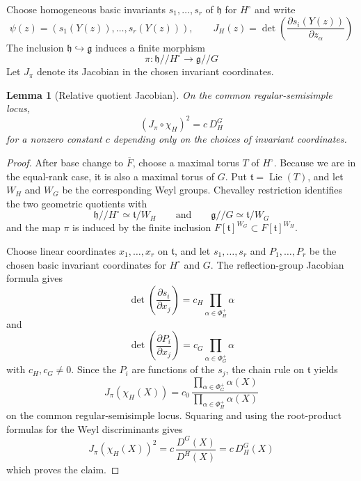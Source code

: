 \documentclass[11pt]{amsart}
\newtheorem{lemma}[lemma]{Lemma}
\theoremstyle{definition}
\theoremstyle{remark}
\newcommand{\Fb}{\overline F}
\newcommand{\Lie}{\operatorname{Lie}}
\newcommand{\g}{\mathfrak g}
\newcommand{\h}{\mathfrak h}
\newcommand{\tT}{\mathfrak t}
\begin{document}
Choose homogeneous basic invariants
$s_1,\ldots,s_r$ of $\h$ for $H^\circ$ and write
\[
 \psi(z)=(s_1(Y(z)),\ldots,s_r(Y(z))),
 \qquad
 J_H(z)=\det\left(
 \frac{\partial s_i(Y(z))}{\partial z_\alpha}
 \right)
\]
The inclusion $\h\hookrightarrow\g$ induces a finite morphism
\[
 \pi:\h/\!/H^\circ\longrightarrow\g/\!/G
\]
Let $J_\pi$ denote its Jacobian in the chosen invariant coordinates.

\begin{lemma}[Relative quotient Jacobian]\label{lem:quotient-map-relative-jacobian}
On the common regular-semisimple locus,
\begin{equation}\label{eq:quotient-map-relative-jacobian}
 (J_\pi\circ\chi_H)^2=c\,D_H^G
\end{equation}
for a nonzero constant $c$ depending only on the choices of invariant
coordinates.
\end{lemma}

\begin{proof}
After base change to $\Fb$, choose a maximal torus $T$ of $H^\circ$.  Because
we are in the equal-rank case, it is also a maximal torus of $G$.  Put
$\tT=\Lie(T)$, and let $W_H$ and $W_G$ be the corresponding Weyl groups.
Chevalley restriction identifies the two geometric quotients with
\[
 \h/\!/H^\circ\simeq\tT/W_H
 \qquad\text{and}\qquad
 \g/\!/G\simeq\tT/W_G
\]
and the map $\pi$ is induced by the finite inclusion
$F[\tT]^{W_G}\subset F[\tT]^{W_H}$.

Choose linear coordinates $x_1,\ldots,x_r$ on $\tT$, and let
$s_1,\ldots,s_r$ and $P_1,\ldots,P_r$ be the chosen basic invariant
coordinates for $H^\circ$ and $G$.  The reflection-group Jacobian formula
gives
\[
 \det\left(\frac{\partial s_i}{\partial x_j}\right)
 =c_H\prod_{\alpha\in\Phi_H^+}\alpha
\]
and
\[
 \det\left(\frac{\partial P_i}{\partial x_j}\right)
 =c_G\prod_{\alpha\in\Phi_G^+}\alpha
\]
with $c_H,c_G\ne0$.  Since the $P_i$ are functions of the $s_j$, the chain
rule on $\tT$ yields
\[
 J_\pi(\chi_H(X))
 =c_0\,
 \frac{\prod_{\alpha\in\Phi_G^+}\alpha(X)}
      {\prod_{\alpha\in\Phi_H^+}\alpha(X)}
\]
on the common regular-semisimple locus.  Squaring and using the root-product formulas
for the Weyl discriminants gives
\[
 J_\pi(\chi_H(X))^2
 =c\,\frac{D^G(X)}{D^H(X)}
 =c\,D_H^G(X)
\]
which proves the claim.
\end{proof}
\end{document}
